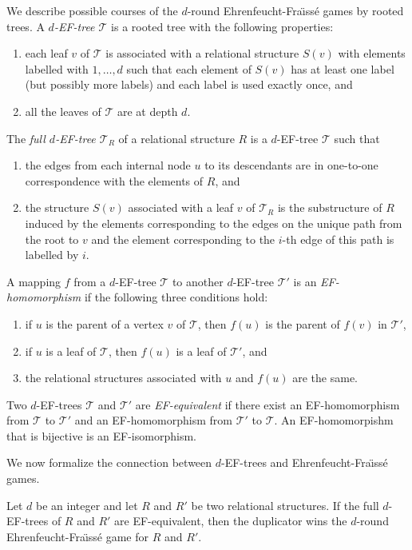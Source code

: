 \documentclass{CSML}
\newcommand{\TT}{\mathcal{T}}
\theoremstyle{plain}\newtheorem{claim}[thm]{Claim}
\begin{document}
We describe possible courses of the $d$-round Ehrenfeucht-Fra{\"\i}ss\'e games by rooted trees.
A {\em $d$-EF-tree $\TT$} is a rooted tree with the following properties:
\begin{enumerate}
\item each leaf $v$ of $\TT$ is associated with a relational structure $S(v)$ with elements labelled with $1,\ldots,d$ such that each element of $S(v)$ has at least one label (but possibly more labels) and each label is used exactly once, and
\item all the leaves of $\TT$ are at depth $d$.
\end{enumerate}
The {\em full $d$-EF-tree $\TT_R$} of a relational structure $R$ is a $d$-EF-tree $\TT$ such that
\begin{enumerate}
\item the edges from each internal node $u$ to its descendants are in one-to-one correspondence with the elements of $R$, and
\item the structure $S(v)$ associated with a leaf $v$ of $\TT_R$ is the substructure of $R$ induced by the elements corresponding to the edges on the unique path from the root to $v$ and the element corresponding to the $i$-th edge of this path is labelled by $i$.
\end{enumerate}
A mapping $f$ from a $d$-EF-tree $\TT$ to another $d$-EF-tree $\TT'$ is an {\em EF-homomor\-phi\-sm} if the following three conditions hold:
\begin{enumerate}
\item if $u$ is the parent of a vertex $v$ of $\TT$, then $f(u)$ is the parent of $f(v)$ in $\TT'$,
\item if $u$ is a leaf of $\TT$, then $f(u)$ is a leaf of $\TT'$, and
\item the relational structures associated with $u$ and $f(u)$ are the same.
\end{enumerate}
Two $d$-EF-trees $\TT$ and $\TT'$ are {\em EF-equivalent}
if there exist an EF-homomorphism from $\TT$ to $\TT'$ and an EF-homomorphism from $\TT'$ to $\TT$.
An EF-homomorpishm that is bijective is an EF-isomorphism.

We now formalize the connection between $d$-EF-trees and Ehrenfeucht-Fra{\"\i}ss\'e games. 

\begin{thm}
\label{thm-EF-tree}
Let $d$ be an integer and let $R$ and $R'$ be two relational structures.
If the full $d$-EF-trees of $R$ and $R'$ are EF-equivalent,
then the duplicator wins the $d$-round Ehrenfeucht-Fra{\"\i}ss\'e game for $R$ and $R'$.
\end{thm}
\end{document}
